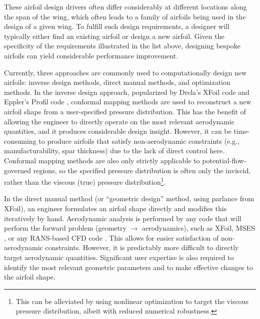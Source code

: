     These airfoil design drivers often differ considerably at different locations along the span of the wing, which often leads to a family of airfoils being used in the design of a given wing. To fulfill such design requirements, a designer will typically either find an existing airfoil or design a new airfoil. Given the specificity of the requirements illustrated in the list above, designing bespoke airfoils can yield considerable performance improvement.

    Currently, three approaches are commonly used to computationally design new airfoils: inverse design methods, direct manual methods, and optimization methods. In the inverse design approach, popularized by Drela's XFoil code \cite{drela_xfoil_1989} and Eppler's Profil code \cite{profil, tao_bs_thesis}, conformal mapping methods are used to reconstruct a new airfoil shape from a user-specified pressure distribution. This has the benefit of allowing the engineer to directly operate on the most relevant aerodynamic quantities, and it produces considerable design insight. However, it can be time-consuming to produce airfoils that satisfy non-aerodynamic constraints (e.g., manufacturability, spar thickness) due to the lack of direct control here. Conformal mapping methods are also only strictly applicable to potential-flow-governed regions, so the specified pressure distribution is often only the inviscid, rather than the viscous (true) pressure distribution\footnote{This can be alleviated by using nonlinear optimization to target the viscous pressure distribution, albeit with reduced numerical robustness.}.

    In the direct manual method (or ``geometric design'' method, using parlance from XFoil), an engineer formulates an airfoil shape directly and modifies this iteratively by hand. Aerodynamic analysis is performed by any code that will perform the forward problem (geometry $\rightarrow$ aerodynamics), such as XFoil, MSES \cite{mses}, or any RANS-based CFD code \cite{adler_cfd_2022}. This allows for easier satisfaction of non-aerodynamic constraints. However, it is predictably more difficult to directly target aerodynamic quantities. Significant user expertise is also required to identify the most relevant geometric parameters and to make effective changes to the airfoil shape.

